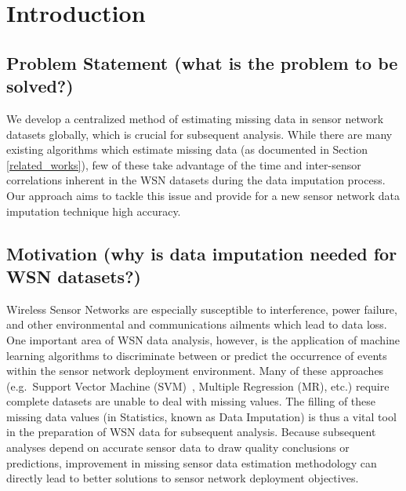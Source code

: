 \section{Introduction}

\subsection{Problem Statement (what is the problem to be solved?)}
We develop a centralized method of estimating missing data in sensor network datasets globally, which is crucial for subsequent analysis.
While there are many existing algorithms which estimate missing data (as documented in Section \ref{related_works}), few of these take advantage of the time and inter-sensor correlations inherent in the WSN datasets during the data imputation process.
Our approach aims to tackle this issue and provide for a new sensor network data imputation technique high accuracy.


\subsection{Motivation (why is data imputation needed for WSN datasets?)}
Wireless Sensor Networks are especially susceptible to interference, power failure, and other environmental and communications ailments which lead to data loss.
One important area of WSN data analysis, however, is the application of machine learning algorithms to discriminate between or predict the occurrence of events within the sensor network deployment environment.
Many of these approaches (e.g.\ Support Vector Machine (SVM)~\cite{vapnik2000nature}, Multiple Regression (MR), etc.) require complete datasets are unable to deal with missing values.
The filling of these missing data values (in Statistics, known as Data Imputation) is thus a vital tool in the preparation of WSN data for subsequent analysis. 
Because subsequent analyses depend on accurate sensor data to draw quality conclusions or predictions, improvement in missing sensor data estimation methodology can directly lead to better solutions to sensor network deployment objectives.

